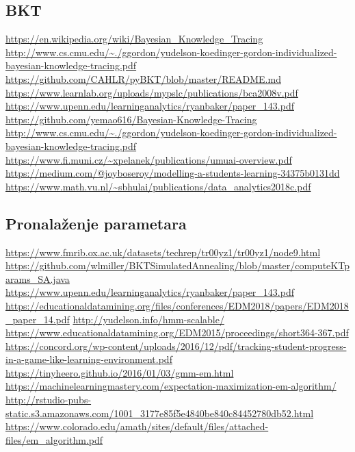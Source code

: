 \documentclass[times, utf8,projekt]{fer}
\begin{document}
\subsection{BKT}
\url{https://en.wikipedia.org/wiki/Bayesian_Knowledge_Tracing}\newline
\url{http://www.cs.cmu.edu/~./ggordon/yudelson-koedinger-gordon-individualized-bayesian-knowledge-tracing.pdf}\newline
\url{https://github.com/CAHLR/pyBKT/blob/master/README.md}\newline
\url{https://www.learnlab.org/uploads/mypslc/publications/bca2008v.pdf}\newline
\url{https://www.upenn.edu/learninganalytics/ryanbaker/paper_143.pdf}\newline
\url{https://github.com/yemao616/Bayesian-Knowledge-Tracing}\newline
\url{http://www.cs.cmu.edu/~./ggordon/yudelson-koedinger-gordon-individualized-bayesian-knowledge-tracing.pdf}\newline
\url{https://www.fi.muni.cz/~xpelanek/publications/umuai-overview.pdf}\newline
\url{https://medium.com/@joyboseroy/modelling-a-students-learning-34375b0131dd}\newline
\url{https://www.math.vu.nl/~sbhulai/publications/data_analytics2018c.pdf}\newline
\subsection{Pronalaženje parametara}
\url{https://www.fmrib.ox.ac.uk/datasets/techrep/tr00yz1/tr00yz1/node9.html}\newline
\url{https://github.com/wlmiller/BKTSimulatedAnnealing/blob/master/computeKTparams_SA.java}\newline
\url{https://www.upenn.edu/learninganalytics/ryanbaker/paper_143.pdf}\newline
\url{https://educationaldatamining.org/files/conferences/EDM2018/papers/EDM2018_paper_14.pdf}\newline
\url{http://yudelson.info/hmm-scalable/}\newline
\url{https://www.educationaldatamining.org/EDM2015/proceedings/short364-367.pdf}\newline
\url{https://concord.org/wp-content/uploads/2016/12/pdf/tracking-student-progress-in-a-game-like-learning-environment.pdf}\newline
\url{https://tinyheero.github.io/2016/01/03/gmm-em.html}\newline
\url{https://machinelearningmastery.com/expectation-maximization-em-algorithm/}\newline
\url{http://rstudio-pubs-static.s3.amazonaws.com/1001_3177e85f5e4840be840c84452780db52.html}\newline
\url{https://www.colorado.edu/amath/sites/default/files/attached-files/em_algorithm.pdf}
\end{document}

